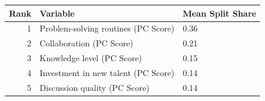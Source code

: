 
\begin{tabular}{rll}
\toprule
Rank & Variable & Mean Split Share\\
\midrule
1 & Problem-solving routines (PC Score) & 0.36\\
2 & Collaboration (PC Score) & 0.21\\
3 & Knowledge level (PC Score) & 0.15\\
4 & Investment in new talent (PC Score) & 0.14\\
5 & Discussion quality (PC Score) & 0.14\\
\bottomrule
\end{tabular}
